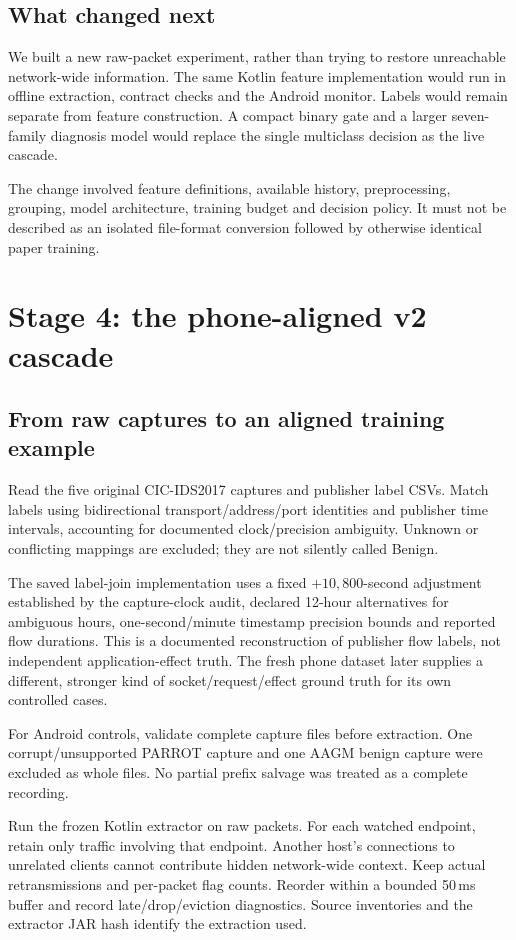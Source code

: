 \documentclass[11pt,a4paper,oneside]{report}
\begin{document}
\section{What changed next}
We built a new raw-packet experiment, rather than trying to restore unreachable network-wide information. The same Kotlin feature implementation would run in offline extraction, contract checks and the Android monitor. Labels would remain separate from feature construction. A compact binary gate and a larger seven-family diagnosis model would replace the single multiclass decision as the live cascade.

The change involved feature definitions, available history, preprocessing, grouping, model architecture, training budget and decision policy. It must not be described as an isolated file-format conversion followed by otherwise identical paper training.

\chapter{Stage 4: the phone-aligned v2 cascade}
\section{From raw captures to an aligned training example}
Read the five original CIC-IDS2017 captures and publisher label CSVs. Match labels using bidirectional transport/address/port identities and publisher time intervals, accounting for documented clock/precision ambiguity. Unknown or conflicting mappings are excluded; they are not silently called Benign.

The saved label-join implementation uses a fixed $+10{,}800$-second adjustment established by the capture-clock audit, declared 12-hour alternatives for ambiguous hours, one-second/minute timestamp precision bounds and reported flow durations. This is a documented reconstruction of publisher flow labels, not independent application-effect truth. The fresh phone dataset later supplies a different, stronger kind of socket/request/effect ground truth for its own controlled cases.

For Android controls, validate complete capture files before extraction. One corrupt/unsupported PARROT capture and one AAGM benign capture were excluded as whole files. No partial prefix salvage was treated as a complete recording.

Run the frozen Kotlin extractor on raw packets. For each watched endpoint, retain only traffic involving that endpoint. Another host's connections to unrelated clients cannot contribute hidden network-wide context. Keep actual retransmissions and per-packet flag counts. Reorder within a bounded 50\,ms buffer and record late/drop/eviction diagnostics. Source inventories and the extractor JAR hash identify the extraction used.
\end{document}
